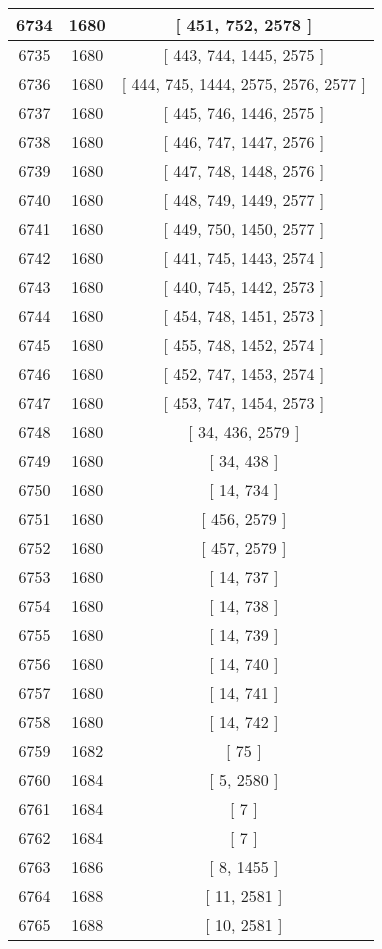 \begin{center}
\begin{longtable}[H]{|| c c c ||}
\hline
6734 & 1680 & [ 451, 752, 2578 ] \\ 
\hline
6735 & 1680 & [ 443, 744, 1445, 2575 ] \\ 
\hline
6736 & 1680 & [ 444, 745, 1444, 2575, 2576, 2577 ] \\ 
\hline
6737 & 1680 & [ 445, 746, 1446, 2575 ] \\ 
\hline
6738 & 1680 & [ 446, 747, 1447, 2576 ] \\ 
\hline
6739 & 1680 & [ 447, 748, 1448, 2576 ] \\ 
\hline
6740 & 1680 & [ 448, 749, 1449, 2577 ] \\ 
\hline
6741 & 1680 & [ 449, 750, 1450, 2577 ] \\ 
\hline
6742 & 1680 & [ 441, 745, 1443, 2574 ] \\ 
\hline
6743 & 1680 & [ 440, 745, 1442, 2573 ] \\ 
\hline
6744 & 1680 & [ 454, 748, 1451, 2573 ] \\ 
\hline
6745 & 1680 & [ 455, 748, 1452, 2574 ] \\ 
\hline
6746 & 1680 & [ 452, 747, 1453, 2574 ] \\ 
\hline
6747 & 1680 & [ 453, 747, 1454, 2573 ] \\ 
\hline
6748 & 1680 & [ 34, 436, 2579 ] \\ 
\hline
6749 & 1680 & [ 34, 438 ] \\ 
\hline
6750 & 1680 & [ 14, 734 ] \\ 
\hline
6751 & 1680 & [ 456, 2579 ] \\ 
\hline
6752 & 1680 & [ 457, 2579 ] \\ 
\hline
6753 & 1680 & [ 14, 737 ] \\ 
\hline
6754 & 1680 & [ 14, 738 ] \\ 
\hline
6755 & 1680 & [ 14, 739 ] \\ 
\hline
6756 & 1680 & [ 14, 740 ] \\ 
\hline
6757 & 1680 & [ 14, 741 ] \\ 
\hline
6758 & 1680 & [ 14, 742 ] \\ 
\hline
6759 & 1682 & [ 75 ] \\ 
\hline
6760 & 1684 & [ 5, 2580 ] \\ 
\hline
6761 & 1684 & [ 7 ] \\ 
\hline
6762 & 1684 & [ 7 ] \\ 
\hline
6763 & 1686 & [ 8, 1455 ] \\ 
\hline
6764 & 1688 & [ 11, 2581 ] \\ 
\hline
6765 & 1688 & [ 10, 2581 ] \\ 

\end{longtable}
\end{center}
